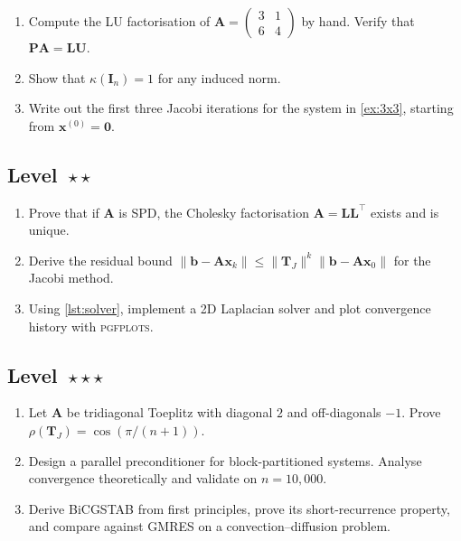 \documentclass[
    language=english,
    doctype=lecture-notes,
    institution=none,
]{../../omnilatex}
\begin{document}
\begin{enumerate}[label=\textbf{\thesection.\arabic*}]
    \item Compute the LU factorisation of
    $\mathbf{A} = \begin{pmatrix} 3 & 1 \\ 6 & 4 \end{pmatrix}$
    by hand. Verify that $\mathbf{PA} = \mathbf{LU}$.
    \label{ex:lu-hand}

    \item Show that $\kappa(\mathbf{I}_n) = 1$ for any induced norm.
    \label{ex:cond-id}

    \item Write out the first three Jacobi iterations for the system in
    \autoref{ex:3x3}, starting from $\mathbf{x}^{(0)} = \mathbf{0}$.
    \label{ex:jacobi-manual}
\end{enumerate}

\subsection*{Level~$\star\star$}

\begin{enumerate}[resume, label=\textbf{\thesection.\arabic*}]
    \item Prove that if $\mathbf{A}$ is SPD, the Cholesky factorisation
    $\mathbf{A} = \mathbf{LL}^{\top}$ exists and is unique.
    \label{ex:cholesky}

    \item Derive the residual bound
    $\|\mathbf{b} - \mathbf{Ax}_k\| \leq
    \|\mathbf{T}_J\|^k \|\mathbf{b} - \mathbf{Ax}_0\|$
    for the Jacobi method.
    \label{ex:residual}

    \item Using \autoref{lst:solver}, implement a 2D Laplacian solver and
    plot convergence history with \textsc{pgfplots}.
    \label{ex:laplacian}
\end{enumerate}

\subsection*{Level~$\star\star\star$}

\begin{enumerate}[resume, label=\textbf{\thesection.\arabic*}]
    \item Let $\mathbf{A}$ be tridiagonal Toeplitz with diagonal $2$ and
    off-diagonals $-1$. Prove $\rho(\mathbf{T}_J) = \cos(\pi/(n+1))$.
    \label{ex:jacobi-spectral}

    \item Design a parallel preconditioner for block-partitioned systems.
    Analyse convergence theoretically and validate on $n = 10{,}000$.
    \label{ex:parallel-precond}

    \item Derive BiCGSTAB from first principles, prove its short-recurrence
    property, and compare against GMRES on a convection--diffusion problem.
    \label{ex:bicgstab}
\end{enumerate}

\printbibliography[heading=subbibintoc, title=References]
\end{document}
